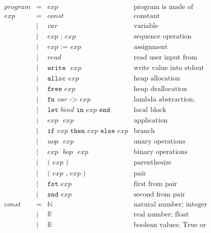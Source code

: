 \documentclass[12pt, a4paper, oneside]{book}
\newcommand{\blank}{\text{ }}
\begin{document}
\begin{figure}[h]
  \begin{math}
    \begin{array}{lcll}
      program & = & exp & \text{program is made of expression} \\
      exp & = & const & \text{constant} \\
              & | & var & \text{variable} \\
              & | & exp \texttt{ ; } exp & \text{sequence operation} \\
              & | & exp \texttt{ := } exp & \text{assignment} \\
              & | & read & \text{read user input from stdin} \\
              & | & \texttt{write} \blank exp & \text{write value into stdout} \\
              & | & \texttt{alloc } exp & \text{heap allocation} \\
              & | & \texttt{free } exp & \text{heap deallocation} \\
              & | & \texttt{fn } var \texttt{ -> } exp & \text{lambda abstraction; anonymous function} \\
              & | & \texttt{let } bind \texttt{ in } exp \texttt{ end} & \text{local block} \\
              & | & exp \blank exp & \text{application} \\
              & | & \texttt{if } exp \texttt{ then } exp \texttt{ else } exp & \text{branch} \\
              & | & uop \blank exp & \text{unary operations} \\
              & | & exp \blank bop \blank exp & \text{binary operations} \\
              & | & \texttt{( } exp \texttt{ )} & \text{parenthesize} \\
              & | & \texttt{( } exp \texttt{ , } exp \texttt{ )} & \text{pair} \\
              & | & \texttt{fst } exp & \text{first from pair} \\
              & | & \texttt{snd } exp & \text{second from pair} \\
      const & = & \mathbb{N} & \text{natural number; integer} \\
              & | & \mathbb{R} & \text{real number; float} \\
              & | & \mathbb{B} & \text{boolean values; True or False} \\

\end{array}
\end{math}
\end{figure}
\end{document}
